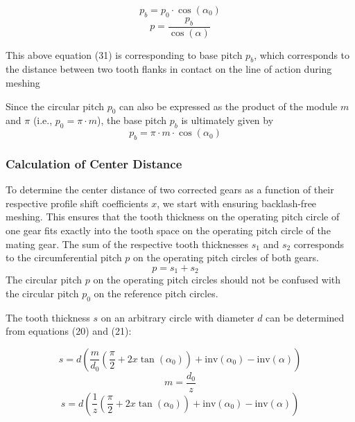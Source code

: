 \documentclass{article}
\begin{document}
\begin{equation}
    p_b= p_0 \cdot \cos(\alpha_0)
\end{equation}
\begin{equation}
    p= \frac{p_b}{\cos(\alpha)}
\end{equation}

This above equation (31) is corresponding to base pitch \( p_b \), which corresponds to the distance between two tooth flanks in contact on the line of action during meshing

Since the circular pitch \( p_0 \) can also be expressed as the product of the module \( m \) and \( \pi \) (i.e., \( p_0 = \pi \cdot m \)), the base pitch \( p_b \) is ultimately given by 
 \begin{equation}
     p_b = \pi \cdot m \cdot \cos(\alpha_0) \quad 
 \end{equation}
\subsubsection{Calculation of Center Distance}
To determine the center distance of two corrected gears as a function of their respective profile shift coefficients \( x \), we start with ensuring backlash-free meshing. This ensures that the tooth thickness on the operating pitch circle of one gear fits exactly into the tooth space on the operating pitch circle of the mating gear. The sum of the respective tooth thicknesses \( s_1 \) and \( s_2 \) corresponds to the circumferential pitch \( p \) on the operating pitch circles of both gears\cite{Calculation-of-involute-gears-6}.
\begin{equation}
    p = s_1 + s_2 \quad 
\end{equation}
The circular pitch \( p \) on the operating pitch circles should not be confused with the circular pitch \( p_0 \) on the reference pitch circles.

The tooth thickness \( s \) on an arbitrary circle with diameter \( d \) can be determined from equations (20) and (21):

\begin{equation}
     s = d \left( \frac{m}{d_0} \left( \frac{\pi}{2} + 2x \tan(\alpha_0) \right) + \text{inv}(\alpha_0) - \text{inv}(\alpha) \right)
\end{equation}
\begin{equation}
    m= \frac{d_0}{z}
\end{equation}
\begin{equation}
    s = d \left( \frac{1}{z} \left( \frac{\pi}{2} + 2x \tan(\alpha_0) \right) + \text{inv}(\alpha_0) - \text{inv}(\alpha) \right)
\end{equation}
\end{document}
